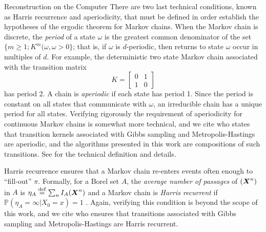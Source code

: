 \begin{chapter}{Reconstruction on the Computer}
There are two last technical conditions, known as Harris recurrence and aperiodicity, that must be defined in order establish the hypotheses of the ergodic theorem for Markov chains.
When the Markov chain is discrete, the \emph{period} of a state $\omega$ is the greatest common denominator of the set $\{m\ge 1; K^m(\omega,\omega > 0\}$; that is, if $\omega$ is $d$-periodic, then returns to state $\omega$ occur in multiples of $d$.
For example, the deterministic two state Markov chain associated with the transition matrix
\begin{equation}
  K = \begin{bmatrix}
    0 & 1\\
    1 & 0
  \end{bmatrix}
\end{equation}
has period 2.
A chain is \emph{aperiodic} if each state has period 1. 
Since the period is constant on all states that communicate with $\omega$, an irreducible chain has a unique period for all states.  
Verifying rigorously the requirement of aperiodicity for continuous Markov chains is somewhat more technical, and we cite \citep{liu2008monte} who states that transition kernels associated with Gibbs sampling and Metropolis-Hastings are aperiodic, and the algorithms presented in this work are compositions of such transitions.
See \citep{robert2013monte} for the technical definition and details.

Harris recurrence ensures that a Markov chain re-enters events often enough to ``fill-out'' $\pi$. 
Formally, for a Borel set $A$, the \emph{average number of passages} of $(\mbox{\boldmath$X$}^n)$ in $A$ is $\eta_A\stackrel{\rm def}{=} \sum_n I_A(\mbox{\boldmath$X$}^n)$ and a Markov chain is \emph{Harris recurrent} if $\mathbb P(\eta_A = \infty|X_0=x) =1$ \citep{robert2013monte}. 
Again, verifying this condition is beyond the scope of this work, and we cite \citep{robert2013monte} who ensures that transitions associated with Gibbs sampling and Metropolis-Hastings are Harris recurrent.


\end{chapter}
